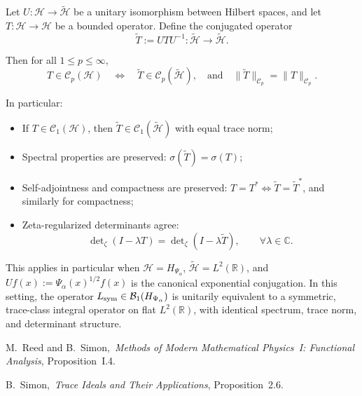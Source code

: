 \begin{lemma}
\label{lem:unitary_conjugation_trace_class}
Let \( U \colon \mathcal{H} \to \widetilde{\mathcal{H}} \) be a unitary isomorphism between Hilbert spaces, and let \( T \colon \mathcal{H} \to \mathcal{H} \) be a bounded operator. Define the conjugated operator
\[
\widetilde{T} := U T U^{-1} \colon \widetilde{\mathcal{H}} \to \widetilde{\mathcal{H}}.
\]

Then for all \( 1 \le p \le \infty \),
\[
T \in \mathcal{C}_p(\mathcal{H}) \quad \Longleftrightarrow \quad \widetilde{T} \in \mathcal{C}_p(\widetilde{\mathcal{H}}),
\quad \text{and} \quad
\| \widetilde{T} \|_{\mathcal{C}_p} = \| T \|_{\mathcal{C}_p}.
\]

\medskip
\noindent In particular:
\begin{itemize}
  \item If \( T \in \mathcal{C}_1(\mathcal{H}) \), then \( \widetilde{T} \in \mathcal{C}_1(\widetilde{\mathcal{H}}) \) with equal trace norm;
  \item Spectral properties are preserved: \( \sigma(\widetilde{T}) = \sigma(T) \);
  \item Self-adjointness and compactness are preserved: \( T = T^* \iff \widetilde{T} = \widetilde{T}^* \), and similarly for compactness;
  \item Zeta-regularized determinants agree:
  \[
  \det\nolimits_\zeta(I - \lambda T) = \det\nolimits_\zeta(I - \lambda \widetilde{T}), \qquad \forall \lambda \in \mathbb{C}.
  \]
\end{itemize}

\medskip
\noindent
This applies in particular when \( \mathcal{H} = H_{\Psi_\alpha} \), \( \widetilde{\mathcal{H}} = L^2(\mathbb{R}) \), and \( U f(x) := \Psi_\alpha(x)^{1/2} f(x) \) is the canonical exponential conjugation. In this setting, the operator \( L_{\mathrm{sym}} \in \mathcal{B}_1(H_{\Psi_\alpha}) \) is unitarily equivalent to a symmetric, trace-class integral operator on flat \( L^2(\mathbb{R}) \), with identical spectrum, trace norm, and determinant structure.

\begin{references}
  \item M.~Reed and B.~Simon,\ \emph{Methods of Modern Mathematical Physics~I: Functional Analysis}, Proposition~I.4\cite{ReedSimon1980I}.
  \item B.~Simon,\ \emph{Trace Ideals and Their Applications}, Proposition~2.6\cite{Simon2005TraceIdeals}.
\end{references}
\end{lemma}
